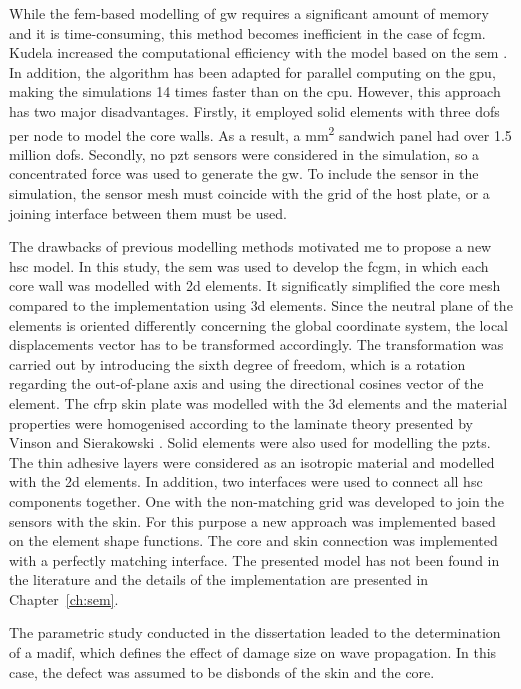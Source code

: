 While the \ac{fem}-based modelling of \ac{gw} requires a significant amount of memory and it is time-consuming, this method becomes inefficient in the case of \ac{fcgm}.
Kudela increased the computational efficiency with the model based on the \ac{sem} \cite{kudela2016parallel}.
In addition, the algorithm has been adapted for parallel computing on the \ac{gpu}, making the simulations 14 times faster than on the \ac{cpu}.
However, this approach has two major disadvantages. Firstly, it employed solid elements with three \acp{dof} per node to model the core walls. As a result, a  \unit{\square\mm} sandwich panel had over 1.5 million \acp{dof}.
Secondly, no \ac{pzt} sensors were considered in the simulation, so a concentrated force was used to generate the \ac{gw}.
To include the sensor in the simulation, the sensor mesh must coincide with the grid of the host plate, or a joining interface between them must be used.

The drawbacks of previous modelling methods motivated me to propose a new \ac{hsc} model.
In this study, the \ac{sem} was used to develop the \ac{fcgm}, in which each core wall was modelled with \ac{2d} elements.
It significatly simplified the core mesh compared to the implementation using \ac{3d} elements.
Since the neutral plane of the elements is oriented differently concerning the global coordinate system, the local displacements vector has to be transformed accordingly.
The transformation was carried out by introducing the sixth degree of freedom, which is a rotation regarding the out-of-plane axis and using the directional cosines vector of the element.
The \ac{cfrp} skin plate was modelled with the \ac{3d} elements and the material properties were homogenised according to the laminate theory presented by Vinson and Sierakowski \cite{vinson1993behavior}.
Solid elements were also used for modelling the \acp{pzt}.
The thin adhesive layers were considered as an isotropic material and modelled with the \ac{2d} elements.
In addition, two interfaces were used to connect all \ac{hsc} components together.
One with the non-matching grid was developed to join the sensors with the skin.
For this purpose a new approach was implemented based on the element shape functions.
The core and skin connection was implemented with a perfectly matching interface.
The presented model has not been found in the literature and the details of the implementation are presented in Chapter~\ref{ch:sem}.

The parametric study conducted in the dissertation leaded to the determination of a \ac{madif}, which defines the effect of damage size on wave propagation.
In this case, the defect was assumed to be disbonds of the skin and the core.